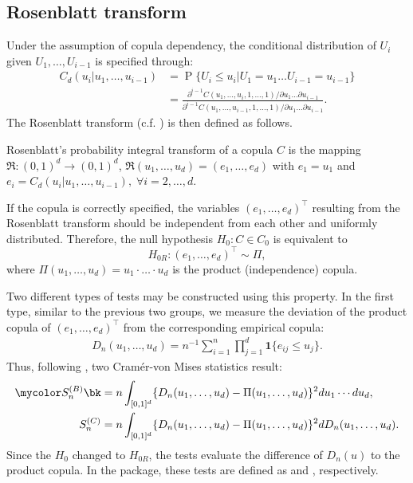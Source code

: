 \subsection{Rosenblatt transform}\label{subsec:Rosenblatt}
Under the assumption of copula dependency, the conditional distribution of $U_i$ given $U_1,\ldots, U_{i-1}$ is specified through:
\begin{align*}
	C_d(u_i|u_1,\ldots,u_{i-1})&=\operatorname{P}\{ U_i \leq u_i|U_1=u_1\ldots U_{i-1}=u_{i-1}\}\\
	&=\frac{\partial^{i-1}C(u_1,\ldots,u_i, 1, \ldots, 1)/\partial u_1\ldots\partial u_{i-1}}{\partial^{i-1}C(u_1,\ldots,u_{i-1}, 1, \ldots, 1)/\partial u_1\ldots\partial u_{i-1}}.
\end{align*}
The Rosenblatt transform (c.f. \citealp{rosenblatt_1952}) is then defined as follows.
\begin{definition}
	Rosenblatt's probability integral transform of a copula $C$ is the mapping $\mathfrak{R}: (0,1)^d \rightarrow (0,1)^d$, $\mathfrak{R}(u_1, \ldots, u_d) = (e_1, \dots, e_d)$ with $e_1 = u_1$ and $e_i=C_d(u_i|u_1,\ldots,u_{i-1}),\;\forall i=2, \dots, d$.
\end{definition}
If the copula is correctly specified, the variables $(e_1, \ldots, e_d)^\top$ resulting from the Rosenblatt transform should be independent from each other and uniformly distributed. Therefore, the null hypothesis $H_0: C\in C_0$ is equivalent to
\begin{equation}\label{eq:RB_hypothesis}
	H_{0R}: (e_1, \dots, e_d)^\top\sim \Pi,
\end{equation}
where $\Pi(u_1, \ldots, u_d) = u_1 \cdot\ldots\cdot u_d$ is the product (independence) copula.

Two different types of tests may be constructed using this property. In the first type, similar to the previous two groups, we measure the deviation of the product copula of $(e_1,\ldots, e_d)^\top$ from the corresponding empirical copula:
\begin{align*}
D_n (u_1,\ldots, u_d) = n^{-1} \sum_{i=1}^{n} \prod_{j=1}^d \mathbf{1}\{e_{ij} \leq u_{j}\}.
\end{align*}
Thus, following \citet{genest_remillard_beaudoin_2009}, two Cram\'{e}r-von Mises statistics result:
\begin{align*}
\mycolor S_n^{(B)} \bk &= n \int_{[0,1]^d} \{D_n(u_1, \ldots, u_d) - \Pi(u_1, \ldots, u_d)\}^2 d u_1\cdots du_d,\\
S_n^{(C)} &= n \int_{[0,1]^d} \{D_n(u_1, \ldots, u_d) - \Pi(u_1,\ldots, u_d)\}^2 dD_n(u_1,\ldots, u_d).
\end{align*}
Since the $H_0$ changed to $H_{0R}$, the tests evaluate the difference of $D_n(u)$ to the product copula. In the package, these tests are defined as  and , respectively.

